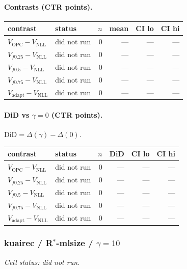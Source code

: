 \documentclass[10pt,a4paper]{article}
\begin{document}
\paragraph{Contrasts (CTR points).}
{\centering\small\begin{tabular}{llrrrr}
\toprule contrast & status & $n$ & mean & CI lo & CI hi \\
\midrule
$V_{\mathrm{OPC}}-V_{\mathrm{NLL}}$ & did not run & 0 & --- & --- & --- \\
$V_{f0.25}-V_{\mathrm{NLL}}$ & did not run & 0 & --- & --- & --- \\
$V_{f0.5}-V_{\mathrm{NLL}}$ & did not run & 0 & --- & --- & --- \\
$V_{f0.75}-V_{\mathrm{NLL}}$ & did not run & 0 & --- & --- & --- \\
$V_{\mathrm{adapt}}-V_{\mathrm{NLL}}$ & did not run & 0 & --- & --- & --- \\
\bottomrule\end{tabular}\par}
\paragraph{DiD vs $\gamma=0$ (CTR points).} $\mathrm{DiD}=\Delta(\gamma)-\Delta(0)$.
{\centering\small\begin{tabular}{llrrrr}
\toprule contrast & status & $n$ & DiD & CI lo & CI hi \\
\midrule
$V_{\mathrm{OPC}}-V_{\mathrm{NLL}}$ & did not run & 0 & --- & --- & --- \\
$V_{f0.25}-V_{\mathrm{NLL}}$ & did not run & 0 & --- & --- & --- \\
$V_{f0.5}-V_{\mathrm{NLL}}$ & did not run & 0 & --- & --- & --- \\
$V_{f0.75}-V_{\mathrm{NLL}}$ & did not run & 0 & --- & --- & --- \\
$V_{\mathrm{adapt}}-V_{\mathrm{NLL}}$ & did not run & 0 & --- & --- & --- \\
\bottomrule\end{tabular}\par}
\bigskip
\subsubsection{kuairec / R$^*$-mlsize / $\gamma=10$}
\emph{Cell status: did not run}.
\end{document}
